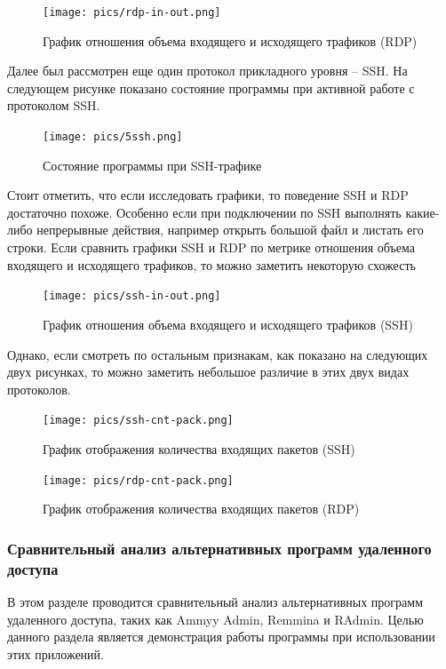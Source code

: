 \documentclass[bachelor, och, coursework]{SCWorks}
\begin{document}
\begin{figure}[H]
  \centering
  \texttt{[image: pics/rdp-in-out.png]}
  \caption{График отношения объема входящего и исходящего трафиков (RDP)}
  \label{rdpg1}
\end{figure}

Далее был рассмотрен еще один протокол прикладного уровня -- SSH. На следующем рисунке показано состояние программы при активной работе
с протоколом SSH.

\begin{figure}[H]
  \centering
  \texttt{[image: pics/5ssh.png]}
  \caption{Состояние программы при SSH-трафике}
  \label{ssh1}
\end{figure}


Стоит отметить, что если исследовать графики, то поведение SSH и RDP достаточно похоже. Особенно если при подключении по SSH
выполнять какие-либо непрерывные действия, например открыть большой файл и листать его строки. Если сравнить графики SSH и RDP по метрике
отношения объема входящего и исходящего трафиков, то можно заметить некоторую схожесть

\begin{figure}[H]
  \centering
  \texttt{[image: pics/ssh-in-out.png]}
  \caption{График отношения объема входящего и исходящего трафиков (SSH)}
  \label{sshg1}
\end{figure}

Однако, если смотреть по остальным признакам, как показано на следующих двух рисунках, то можно заметить небольшое различие в этих двух видах протоколов.

\begin{figure}[H]
  \centering
  \texttt{[image: pics/ssh-cnt-pack.png]}
  \caption{График отображения количества входящих пакетов (SSH)}
  \label{sshg2}
\end{figure}


\begin{figure}[H]
  \centering
  \texttt{[image: pics/rdp-cnt-pack.png]}
  \caption{График отображения количества входящих пакетов (RDP)}
  \label{rdpg2}
\end{figure}


\subsubsection{Сравнительный анализ альтернативных программ удаленного доступа}

В этом разделе проводится сравнительный анализ альтернативных программ удаленного 
доступа, таких как Ammyy Admin, Remmina и RAdmin. Целью данного раздела является демонстрация работы программы 
при использовании этих приложений.
\end{document}
